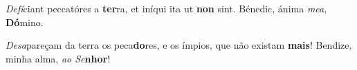 \begin{greenumerate}
  \switchcolumn*


  \item \textit{Defí}ciant peccatóres a \textbf{ter}ra, {\GreDagger} et iníqui ita ut \textbf{non} sint. {\GreStar} Bénedic, ánima \textit{mea}, \textbf{Dó}mino. 

  \switchcolumn%

  \item \textit{Desa}pareçam da terra os peca\textbf{do}res, {\GreDagger} e os ímpios, que não existam \textbf{mais}! {\GreStar} Bendize, minha alma, \textit{ao Se}\textbf{nhor}! 
\end{greenumerate}